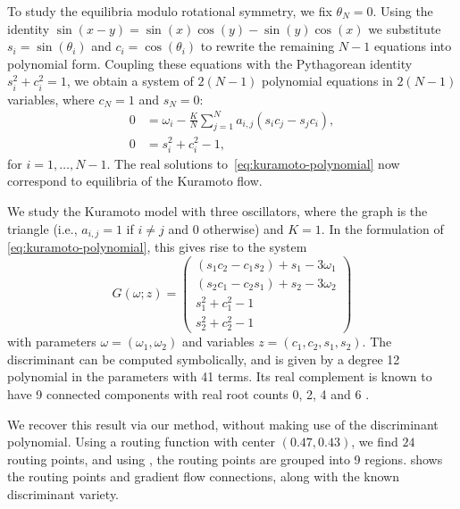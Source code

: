 \documentclass[11pt]{article}
\numberwithin{equation}{section}
\theoremstyle{plain}
\theoremstyle{definition}
\theoremstyle{remark}
\begin{document}
To study the equilibria modulo rotational symmetry, we fix $\theta_{N} = 0$. Using the identity $\sin(x-y) = \sin(x)\cos(y) - \sin(y)\cos(x)$ we substitute $s_{i} = \sin(\theta_{i})$ and $c_{i} = \cos(\theta_{i})$ to rewrite the remaining $N-1$ equations into polynomial form. Coupling these equations with the Pythagorean identity $s_{i}^{2} + c_{i}^{2} = 1$, we obtain a system of $2(N-1)$ polynomial equations in $2(N-1)$ variables, where $c_N=1$ and $s_N=0$:
\begin{equation}\label{eq:kuramoto-polynomial}
    \begin{split}
        0 & = \omega_{i} - \frac{K}{N}\sum\limits_{j=1}^{N}a_{i,j}(s_{i}c_{j} - s_{j}c_{i}),\\
        0 & = s_{i}^{2} + c_{i}^{2} - 1,
    \end{split}
\end{equation}
for $i=1,\ldots,{N-1}$. The real solutions to~\eqref{eq:kuramoto-polynomial} now correspond to equilibria of the Kuramoto flow. 

We study the Kuramoto model with three oscillators, where the graph is the triangle (i.e., $a_{i,j} = 1$ if $i\neq j$ and $0$ otherwise) and $K=1$. In the formulation of \eqref{eq:kuramoto-polynomial}, this gives rise to the system
\begin{equation}\label{kuramoto_eq}
G(\omega; z) = \begin{pmatrix}
(s_{1}c_{2} - c_{1}s_{2}) + s_{1} - 3 \omega_{1}\\[0.2em]
(s_{2}c_{1} - c_{2}s_{1}) + s_{2} - 3 \omega_{2}\\[0.2em]
s_{1}^{2} + c_{1}^{2} - 1\\[0.2em]
s_{2}^{2} + c_{2}^{2} - 1
\end{pmatrix}
\end{equation}
with parameters $\omega= (\omega_1,\omega_2)$ and variables $z=(c_1,c_2,s_1,s_2)$. 
The discriminant can be computed symbolically, and is given by a degree 12 polynomial in the parameters with 41 terms. Its real complement is known to have 9 connected components with real root counts 0, 2, 4 and 6 \cite{CossHauensteinHongMolzahn2018,RealMonodromy}. 

We recover this result via our method, without making use of the discriminant polynomial. Using a routing function with center $(0.47,0.43)$, we find $24$ routing points, and using , the routing points are grouped into 9 regions.  shows the routing points and gradient flow connections, along with the known discriminant variety.
\end{document}
